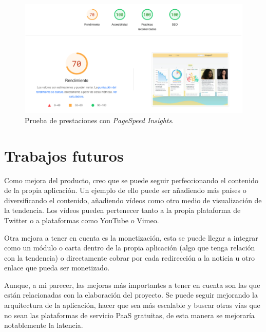 \begin{figure}[H]
    \centering
    \myfloatalign
    \includegraphics[width=1\textwidth]{gfx/prueba0.png}
    \caption[Prueba de prestaciones con \textit{PageSpeed Insights}]{Prueba de prestaciones con \textit{PageSpeed Insights}.}\label{gfx:prueba50}
\end{figure}

\section{Trabajos futuros}
Como mejora del producto, creo que se puede seguir perfeccionando el contenido de la propia aplicación. Un ejemplo de ello puede ser añadiendo más países o diversificando el contenido, añadiendo vídeos como otro medio de visualización de la tendencia. Los vídeos pueden pertenecer tanto a la propia plataforma de Twitter o a plataformas como YouTube o Vimeo. 

\vspace{0.3cm}

Otra mejora a tener en cuenta es la monetización, esta se puede llegar a integrar como un módulo o carta dentro de la propia aplicación (algo que tenga relación con la tendencia) o directamente cobrar por cada redirección a la noticia u otro enlace que pueda ser monetizado.

\vspace{0.3cm}

Aunque, a mi parecer, las mejoras más importantes a tener en cuenta son las que están relacionadas con la elaboración del proyecto. Se puede seguir mejorando la arquitectura de la aplicación, hacer que sea más escalable y buscar otras vías que no sean las plataformas de servicio \ac{PaaS} gratuitas, de esta manera se mejoraría notablemente la latencia.

\vspace{0.3cm}

